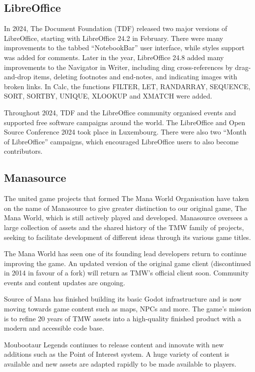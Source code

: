 \documentclass[a4paper]{report}
\begin{document}
\subsection{LibreOffice}

In 2024, The Document Foundation (TDF) released two major versions of LibreOffice, starting with LibreOffice 24.2 in February. There were many improvements to the tabbed “NotebookBar” user interface, while styles support was added for comments. Later in the year, LibreOffice 24.8 added many improvements to the Navigator in Writer, including ding cross-references by drag-and-drop items, deleting footnotes and end-notes, and indicating images with broken links. In Calc, the functions FILTER, LET, RANDARRAY, SEQUENCE, SORT, SORTBY, UNIQUE, XLOOKUP and XMATCH were added.

Throughout 2024, TDF and the LibreOffice community organised events and supported free software campaigns around the world. The LibreOffice and Open Source Conference 2024 took place in Luxembourg. There were also two ``Month of LibreOffice'' campaigns, which encouraged LibreOffice users to also become contributors.

\subsection{Manasource}

The united game projects that formed The Mana World Organisation have taken on the name of Manasource to give greater distinction to our original game, The Mana World, which is still actively played and developed. Manasource oversees a large collection of assets and the shared history of the TMW family of projects, seeking to facilitate development of different ideas through its various game titles.

The Mana World has seen one of its founding lead developers return to continue improving the game. An updated version of the original game client (discontinued in 2014 in favour of a fork) will return as TMW's official client soon. Community events and content updates are ongoing.

Source of Mana has finished building its basic Godot infrastructure and is now moving towards game content such as maps, NPCs and more. The game's mission is to refine 20 years of TMW assets into a high-quality finished product with a modern and accessible code base.

Moubootaur Legends continues to release content and innovate with new additions such as the Point of Interest system. A huge variety of content is available and new assets are adapted rapidly to be made available to players.
\end{document}
